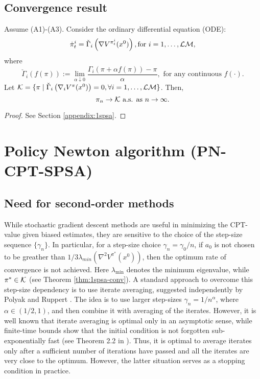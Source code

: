 \documentclass[11pt,letterpaper,english]{article}
\begin{document}
\subsection{Convergence result}
\begin{theorem}
\label{thm:1spsa-conv}
Assume (A1)-(A3).
Consider the  ordinary differential equation (ODE): 
$$\dot\pi^{i}_t = \check\Gamma_{i}\left( \nabla V^{\pi^{i}_t}(x^0)\right), \text{for }i=1,\dots,\mathcal{L}\mathcal{M},$$ 
where 
$$\check\Gamma_{i}(f(\pi)) := \lim\limits_{\alpha \downarrow 0} \frac{\Gamma_{i}(\pi + \alpha f(\pi)) - \pi}{\alpha}, \textrm{ for any continuous }f(\cdot).$$
 Let $\mathcal{K} = \{\pi \mid \check\Gamma_{i} \left(\nabla_i V^{\pi}(x^0)\right)=0, \forall i=1,\ldots,\mathcal{L}\mathcal{M}\}$. Then,
$$\pi_n \rightarrow \mathcal{K} \text{ a.s. as } n\rightarrow \infty.$$
\end{theorem}
\begin{proof}
 See Section \ref{appendix:1spsa}.
\end{proof}



\section{Policy Newton algorithm (PN-CPT-SPSA)}
\label{sec:2spsa}
\subsection{Need for second-order methods}
While stochastic gradient descent methods are useful in minimizing the CPT-value given biased estimates, they are sensitive to the choice of the step-size sequence $\{\gamma_n\}$.  In particular, for a step-size choice $\gamma_n = \gamma_0/n$, if $a_0$ is not chosen to be greather than $1/3 \lambda_{min}(\nabla^2 V^{\pi^*}(x^0))$, then the optimum rate of convergence is not achieved. Here $\lambda_{\min}$ denotes the minimum eigenvalue, while $\pi^*\in \mathcal{K}$ (see Theorem \ref{thm:1spsa-conv}). A standard approach to overcome this step-size dependency is to use iterate averaging, suggested independently by Polyak \cite{polyak1992acceleration} and Ruppert \cite{ruppert1991stochastic}. The idea is to use larger step-sizes $\gamma_n = 1/n^\alpha$, where $\alpha \in (1/2,1)$, and then combine it with averaging of the iterates. However, it is well known  that iterate averaging is optimal only in an asymptotic sense, while finite-time bounds show that the initial condition is not forgotten sub-exponentially fast (see 
Theorem 2.2 in \cite{fathi2013transport}). Thus, it is optimal to average iterates only 
after a sufficient number of iterations have passed and all the iterates are very close to the optimum. However, the latter situation serves as a stopping condition in practice.
\end{document}
